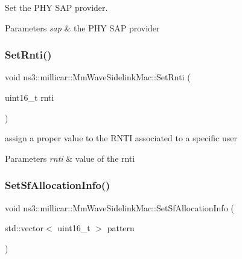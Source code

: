 Set the P\+HY S\+AP provider. 


\begin{DoxyParams}{Parameters}
{\em sap} & the P\+HY S\+AP provider \\
\hline
\end{DoxyParams}
\mbox{\label{classns3_1_1millicar_1_1MmWaveSidelinkMac_af1686c0688c1bafeccb463ea2bc6f828}} 
\subsubsection{\texorpdfstring{Set\+Rnti()}{SetRnti()}}
{\footnotesize\ttfamily void ns3\+::millicar\+::\+Mm\+Wave\+Sidelink\+Mac\+::\+Set\+Rnti (\begin{DoxyParamCaption}\item[{uint16\+\_\+t}]{rnti }\end{DoxyParamCaption})}



assign a proper value to the R\+N\+TI associated to a specific user 


\begin{DoxyParams}{Parameters}
{\em rnti} & value of the rnti \\
\hline
\end{DoxyParams}
\mbox{\label{classns3_1_1millicar_1_1MmWaveSidelinkMac_a3862171847195f4cf9122fb8f05ed3eb}} 
\subsubsection{\texorpdfstring{Set\+Sf\+Allocation\+Info()}{SetSfAllocationInfo()}}
{\footnotesize\ttfamily void ns3\+::millicar\+::\+Mm\+Wave\+Sidelink\+Mac\+::\+Set\+Sf\+Allocation\+Info (\begin{DoxyParamCaption}\item[{std\+::vector$<$ uint16\+\_\+t $>$}]{pattern }\end{DoxyParamCaption})}



